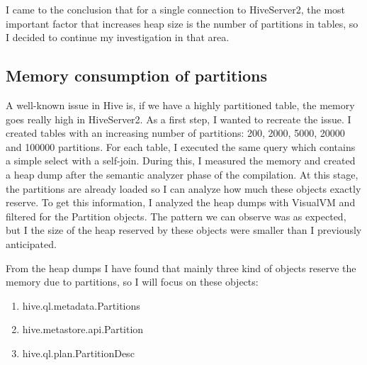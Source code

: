 I came to the conclusion that for a single connection to HiveServer2, the most important factor that increases heap size is the number of partitions in tables, so I decided to continue my investigation in that area. 

\subsection{Memory consumption of partitions}
A well-known issue in Hive is, if we have a highly partitioned table, the memory goes really high in HiveServer2. As a first step, I wanted to recreate the issue. I created tables with an increasing number of partitions: 200, 2000, 5000, 20000 and 100000 partitions. For each table, I executed the same query which contains a simple select with a self-join. During this, I measured the memory and created a heap dump after the semantic analyzer phase of the compilation. At this stage, the partitions are already loaded so I can analyze how much these objects exactly reserve. To get this information, I analyzed the heap dumps with VisualVM and filtered for the Partition objects. The pattern we can observe was as expected, but I the size of the heap reserved by these objects were smaller than I previously anticipated.

\noindent From the heap dumps I have found that mainly three kind of objects reserve the memory due to partitions, so I will focus on these objects: 
\begin{enumerate}
	\item hive.ql.metadata.Partitions
	\item hive.metastore.api.Partition
	\item hive.ql.plan.PartitionDesc
\end{enumerate}

